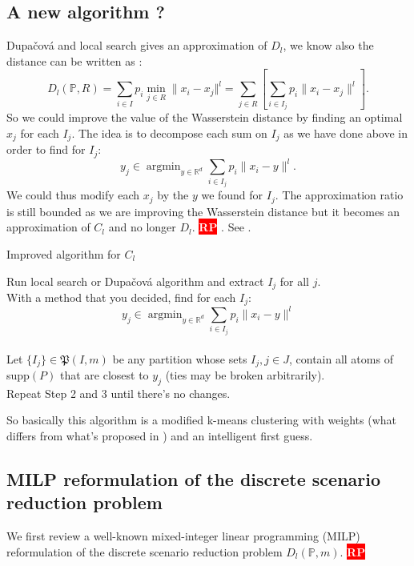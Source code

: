 \documentclass{amsart}
\newcommand{\argmin}{\mathop{\arg\min}}
\newcommand{\nb}[3]{
		{\colorbox{#2}{\bfseries\sffamily\tiny\textcolor{white}{#1}}}
		{\textcolor{#2}{\text{$\blacktriangleright$}{\textcolor{#2}{#3}}\text{$\blacktriangleleft$}}}}
\newcommand{\rp}[1]{\nb{RP}{red}{#1}}
\newcommand{\RR}{\mathbb{R}}
\begin{document}
\subsection{A new algorithm ?}
Dupačová and local search gives an approximation of $D_l$, we know also the distance can be written as :
$$D_l\left(\mathbb{P},R\right)=\sum_{i\in I}p_i\min_{j\in R}\lVert x_i-x_j\Vert^l=\sum_{j\in R}\left[\sum_{i\in I_j}p_i\lVert x_i-x_j\rVert^l\right].$$
So we could improve the value of the Wasserstein distance by finding an optimal $x_j$ for each $I_j$. The idea is to decompose each sum on $I_j$ as we have done above in order to find for $I_j$: 
$$
y_j\in \argmin_{y\in\RR^d}\sum_{i\in I_j}p_i\lVert x_i-y\rVert^l.
$$
We could thus modify each $x_j$ by the $y$ we found for $I_j$. The approximation ratio is still bounded as we are improving the Wasserstein distance but it becomes an approximation of $C_l$ and no longer $D_l$. \rp{idea to improve }. See .

\begin{algorithm}[h]\caption{Improved algorithm for $C_l$}
    \label{improved ls}
    Run local search or Dupačová algorithm and extract $I_j$ for all $j$. \\
    With a method that you decided, find for each $I_j$: $$y_j\in\argmin_{y\in\RR^d}\sum_{i\in I_j}p_i\lVert x_i-y\rVert^l$$
    \\ Let $\{I_j\}\in\mathfrak{P}\left(I,m\right)$ be any partition whose sets $I_j, j\in J$, contain all atoms of supp$\left(P\right)$ that are closest to $y_j$ (ties may be broken arbitrarily). \\
    Repeat Step 2 and 3 until there's no changes.
\end{algorithm}

So basically this algorithm is a  modified k-means clustering with weights (what differs from what's proposed in \cite{rujeerapaiboon_scenario_2022}) and an intelligent first guess.
\subsection{MILP reformulation of the discrete scenario reduction problem}
We first review a well-known mixed-integer linear programming (MILP) reformulation of the discrete scenario reduction problem $D_l\left(\mathbb{P},m\right)$.\rp{find a reference}
\end{document}
